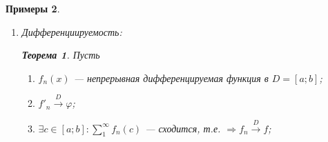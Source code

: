 \documentclass[a4paper, 12pt]{article}
\newtheorem{Examples}{Примеры}
\newtheorem{Thm}{Теорема}
\newtheorem{Note}{Замечание}
\begin{document}
\begin{Examples}
\begin{enumerate}
                \begin{Note}
                    Результат теоремы и её следствие можно усилить, 
                    если непрерывность заменить на интегрируемость.
                    (С сохранением условий равномерной сходимости.)
                \end{Note}

                \newpage

                \begin{Examples}
                \leavevmode
                    \begin{enumerate}
                        \item 
                            \( \sum^{\infty}_{1} \frac{x ^ {k - 1}}{k},
                            x \in (-1; 1);
                            [-\alpha; \alpha]; 0 < \alpha < 1\);\\
                            \(\sum^{\infty}_{0} x^k\) --- равномерно сходится на
                            \( [-\alpha; \alpha] \);\\

                            \(\sum^{\infty}_{1} \frac{x ^ {k - 1}}{k} =
                            \frac{ln(1 - x)}{x} - ln(1 - x) = 
                            \int^{x}_{a} \frac{\mathrm{d}t}{1 - t} = \int^{x}_{a} 
                            (\sum^{\infty}_{k = 0} tk) \mathrm{d}t \underset{\text{теорема}}{=}
                            \sum^{\infty}_{k = 0} (\int^{x}_{0} t^k\mathrm{d}t) = 
                            \sum^{\infty}_{k = 0} \left.\frac{t ^ {k + 1}}{k + 1}
                            \right|^{x}_{0} =\sum^{\infty}_{k = 0} 
                            \frac{x ^ {k + 1}}{k + 1} = \sum^{\infty}_{k = 1} 
                            \frac{x ^ k}{k} = x \cdot \sum^{\infty}_{k = 1} 
                            \frac{x^{k = 1}}{l}\) непрывна в D.
                    \end{enumerate}
                \end{Examples}
             \item 
                Дифференциируемость:\\

                \begin{Thm}
                    Пусть
                    \begin{enumerate}
                        \item 
                            \(f_n(x)\) --- непрерывная дифференцируемая функция в \(D = [a; b]\);
                        \item
                            \( f'_n \xrightarrow{D} \varphi\);
                        \item
                        \(\exists c \in [a; b]: \sum^{\infty}_{1} f_n(c)\) --- сходится, т.е. \( \Rightarrow f_n \xrightarrow{D} f\);
                            

\end{enumerate}
\end{Thm}
\end{enumerate}
\end{Examples}
\end{document}
